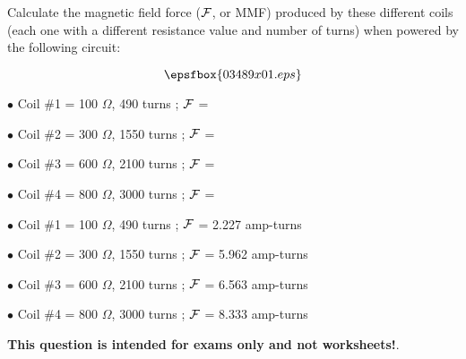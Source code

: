 

Calculate the magnetic field force ($\cal F$, or MMF) produced by these different coils (each one with a different resistance value and number of turns) when powered by the following circuit: 

$$\epsfbox{03489x01.eps}$$

\medskip
\item{$\bullet$} Coil \#1 = 100 $\Omega$, 490 turns ; $\cal F$ = 
\vskip 5pt
\item{$\bullet$} Coil \#2 = 300 $\Omega$, 1550 turns ; $\cal F$ = 
\vskip 5pt
\item{$\bullet$} Coil \#3 = 600 $\Omega$, 2100 turns ; $\cal F$ = 
\vskip 5pt
\item{$\bullet$} Coil \#4 = 800 $\Omega$, 3000 turns ; $\cal F$ = 
\medskip







\medskip
\item{$\bullet$} Coil \#1 = 100 $\Omega$, 490 turns ; $\cal F$ = 2.227 amp-turns
\vskip 5pt
\item{$\bullet$} Coil \#2 = 300 $\Omega$, 1550 turns ; $\cal F$ = 5.962 amp-turns
\vskip 5pt
\item{$\bullet$} Coil \#3 = 600 $\Omega$, 2100 turns ; $\cal F$ = 6.563 amp-turns
\vskip 5pt
\item{$\bullet$} Coil \#4 = 800 $\Omega$, 3000 turns ; $\cal F$ = 8.333 amp-turns
\medskip







{\bf This question is intended for exams only and not worksheets!}.



